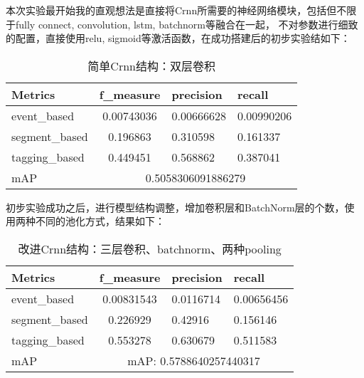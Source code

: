 \documentclass[]{ctexart}
\begin{document}
本次实验最开始我的直观想法是直接将Crnn所需要的神经网络模块，包括但不限于fully connect, convolution, lstm, batchnorm等融合在一起，
不对参数进行细致的配置，直接使用relu, sigmoid等激活函数，在成功搭建后的初步实验结如下：
\begin{table}[ht]
    \centering
    \begin{tabular}{|l|cll|}
    \hline
    Metrics        & \multicolumn{1}{c|}{f\_measure} & \multicolumn{1}{l|}{precision}  & recall     \\ \hline
    event\_based   & \multicolumn{1}{c|}{0.00743036} & \multicolumn{1}{l|}{0.00666628} & 0.00990206 \\ \hline
    segment\_based & \multicolumn{1}{c|}{0.196863}   & \multicolumn{1}{l|}{0.310598}   & 0.161337   \\ \hline
    tagging\_based & \multicolumn{1}{c|}{0.449451}   & \multicolumn{1}{l|}{0.568862}   & 0.387041   \\ \hline
    mAP            & \multicolumn{3}{c|}{0.5058306091886279}                                        \\ \hline
    \end{tabular}
    \caption{简单Crnn结构：双层卷积}
    \label{exp1}
\end{table}

初步实验成功之后，进行模型结构调整，增加卷积层和BatchNorm层的个数，使用两种不同的池化方式，结果如下：
\begin{table}[ht]
    \centering
    \begin{tabular}{|l|cll|}
    \hline
    Metrics        & \multicolumn{1}{c|}{f\_measure} & \multicolumn{1}{l|}{precision}  & recall     \\ \hline
    event\_based   & \multicolumn{1}{c|}{0.00831543} & \multicolumn{1}{l|}{0.0116714}  & 0.00656456 \\ \hline
    segment\_based & \multicolumn{1}{c|}{0.226929}   & \multicolumn{1}{l|}{0.42916}    & 0.156146   \\ \hline
    tagging\_based & \multicolumn{1}{c|}{0.553278}   & \multicolumn{1}{l|}{0.630679}   & 0.511583   \\ \hline
    mAP            & \multicolumn{3}{c|}{mAP: 0.5788640257440317}                                        \\ \hline
    \end{tabular}
    \caption{改进Crnn结构：三层卷积、batchnorm、两种pooling}
    \label{exp2}
\end{table}
\end{document}
